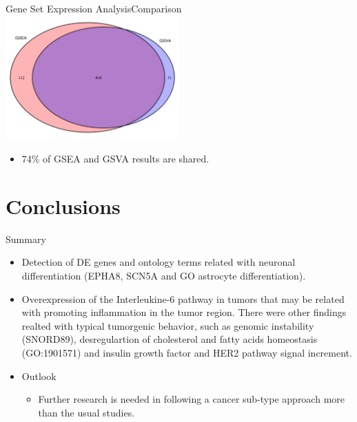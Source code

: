 \documentclass{beamer}
\begin{document}
\begin{frame}{Gene Set Expression Analysis}{Comparison}
  \centering
  \includegraphics[width=0.5\textwidth,height=0.5\textheight,keepaspectratio]{venn}
  \begin{itemize}
    \item
      74\% of GSEA and GSVA results are shared. 
  \end{itemize}

    
\end{frame}




\section{Conclusions}

\begin{frame}{Summary}
  \begin{itemize}
  \item
    Detection of DE genes and ontology terms related with neuronal differentiation (EPHA8, SCN5A and GO astrocyte differentiation). 
  \vspace{10pt}
  \item
    Overexpression of the Interleukine-6 pathway in tumors that may be related with promoting inflammation in the tumor region. There were other findings realted with typical tumorgenic behavior, such as genomic instability (SNORD89), desregulartion of cholesterol and fatty acids homeostasis (GO:1901571) and insulin growth factor and HER2 pathway signal increment. 

  \end{itemize}
  
  \begin{itemize}
  \item
    Outlook
    \begin{itemize}
    \item
      Further research is needed in following a cancer sub-type approach more than the usual studies.
    \end{itemize}
  \end{itemize}
\end{frame}
\end{document}
